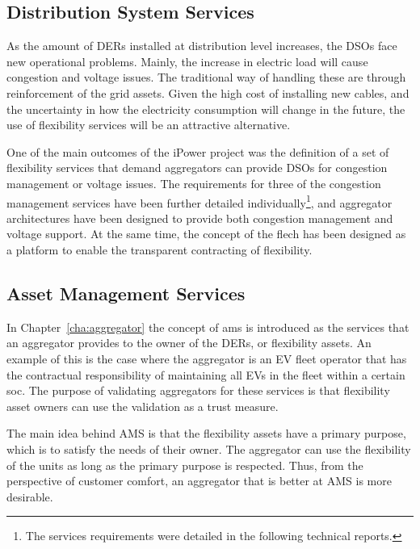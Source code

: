 \subsection{Distribution System Services} %
\label{sub:dsoservices}
As the amount of DERs installed at distribution level increases, the DSOs face new operational problems. Mainly, the increase in electric load will cause congestion and voltage issues. The traditional way of handling these are through reinforcement of the grid assets. Given the high cost of installing new cables, and the uncertainty in how the electricity consumption will change in the future, the use of flexibility services will be an attractive alternative.

One of the main outcomes of the iPower project was the definition of a set of flexibility services that demand aggregators can provide DSOs for congestion management or voltage issues. The requirements for three of the congestion management services have been further detailed individually\footnote{The services requirements were detailed in the following technical reports\cite{hansen2013flech,biegel2014flech,bondy2014flech}.}, and aggregator architectures have been designed to provide both congestion management and voltage support. At the same time, the concept of the \gls{flech} has been designed as a platform to enable the transparent contracting of flexibility.

\subsection{Asset Management Services} %
\label{sub:assetmanagementservices}
In Chapter~\ref{cha:aggregator} the concept of \gls{ams} is introduced as the services that an aggregator provides to the owner of the DERs, or flexibility assets. An example of this is the case where the aggregator is an EV fleet operator that has the contractual responsibility of maintaining all EVs in the fleet within a certain \gls{soc}. The purpose of validating aggregators for these services is that flexibility asset owners can use the validation as a trust measure.

The main idea behind AMS is that the flexibility assets have a primary purpose, which is to satisfy the needs of their owner. The aggregator can use the flexibility of the units as long as the primary purpose is respected. Thus, from the perspective of customer comfort, an aggregator that is better at AMS is more desirable. 
